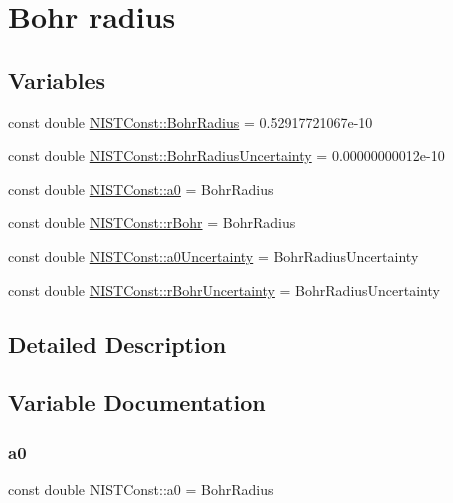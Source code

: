 \hypertarget{group___bohr_radius}{}\section{Bohr radius}
\label{group___bohr_radius}
\subsection*{Variables}
\begin{DoxyCompactItemize}
\item 
const double \hyperlink{group___bohr_radius_ga38bdb86c2f3e484e8b164e75a3980638}{N\+I\+S\+T\+Const\+::\+Bohr\+Radius} = 0.\+52917721067e-\/10
\item 
const double \hyperlink{group___bohr_radius_gad031da8c7a2e239441e06c10fd8f6f07}{N\+I\+S\+T\+Const\+::\+Bohr\+Radius\+Uncertainty} = 0.\+00000000012e-\/10
\item 
const double \hyperlink{group___bohr_radius_gaa79b6b930d252d0cda2711c7993e918a}{N\+I\+S\+T\+Const\+::a0} = Bohr\+Radius
\item 
const double \hyperlink{group___bohr_radius_gad2a74a106c13086263e42411835b6352}{N\+I\+S\+T\+Const\+::r\+Bohr} = Bohr\+Radius
\item 
const double \hyperlink{group___bohr_radius_ga69cffcfd4d8bdc8525818d56ac079b8d}{N\+I\+S\+T\+Const\+::a0\+Uncertainty} = Bohr\+Radius\+Uncertainty
\item 
const double \hyperlink{group___bohr_radius_ga5cbe12af6cb3e4962e629970564c7905}{N\+I\+S\+T\+Const\+::r\+Bohr\+Uncertainty} = Bohr\+Radius\+Uncertainty
\end{DoxyCompactItemize}


\subsection{Detailed Description}


\subsection{Variable Documentation}
\mbox{\label{group___bohr_radius_gaa79b6b930d252d0cda2711c7993e918a}} 
\subsubsection{\texorpdfstring{a0}{a0}}
{\footnotesize\ttfamily const double N\+I\+S\+T\+Const\+::a0 = Bohr\+Radius}

